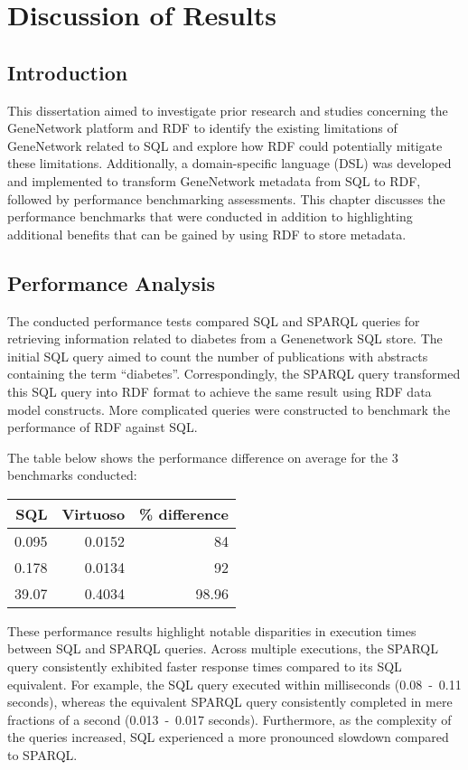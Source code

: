 \chapter{Discussion of Results}

\section{Introduction}

This dissertation aimed to investigate prior research and studies concerning the GeneNetwork platform and RDF to identify the existing limitations of GeneNetwork related to SQL and explore how RDF could potentially mitigate these limitations.  Additionally, a domain-specific language (DSL) was developed and implemented to transform GeneNetwork metadata from SQL to RDF, followed by performance benchmarking assessments.  This chapter discusses the performance benchmarks that were conducted in addition to highlighting additional benefits that can be gained by using RDF to store metadata.


\section{Performance Analysis}

The conducted performance tests compared SQL and SPARQL queries for retrieving information related to diabetes from a Genenetwork SQL store.  The initial SQL query aimed to count the number of publications with abstracts containing the term ``diabetes''.  Correspondingly, the SPARQL query transformed this SQL query into RDF format to achieve the same result using RDF data model constructs.  More complicated queries were constructed to benchmark the performance of RDF against SQL.\@

The table below shows the performance difference on average for the 3 benchmarks conducted:

\begin{center}
\begin{tabular}{rrr}
SQL & Virtuoso & \% difference\\[0pt]
\toprule
0.095 & 0.0152 & 84\\[0pt]
0.178 & 0.0134 & 92\\[0pt]
39.07 & 0.4034 & 98.96\\[0pt]
\end{tabular}
\end{center}

These performance results highlight notable disparities in execution times between SQL and SPARQL queries.  Across multiple executions, the SPARQL query consistently exhibited faster response times compared to its SQL equivalent.  For example, the SQL query executed within milliseconds (0.08~-~0.11 seconds), whereas the equivalent SPARQL query consistently completed in mere fractions of a second (0.013~-~0.017 seconds).  Furthermore, as the complexity of the queries increased, SQL experienced a more pronounced slowdown compared to SPARQL\@.

